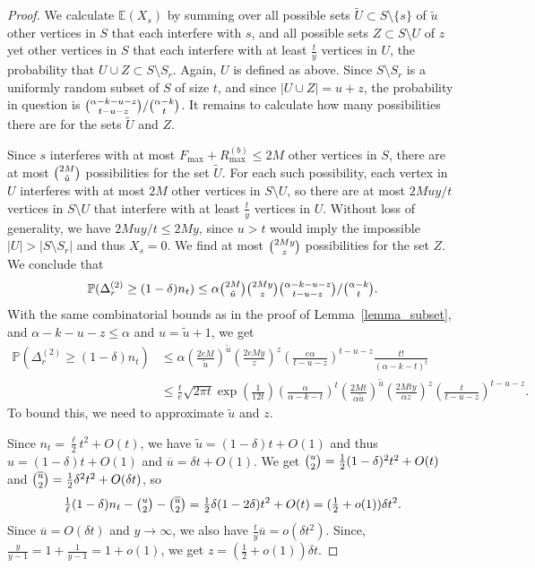 \documentclass{article}
\theoremstyle{plain}
\theoremstyle{remark}
\theoremstyle{plain}
\numberwithin{equation}{section}
\begin{document}
\begin{proof}
		We calculate $\mathbb{E}(X_s)$ by summing over all possible sets $\widetilde{U}\subset S\setminus\{s\}$ of $\widetilde{u}$ other vertices in $S$ that each interfere with $s$, and all possible sets $Z\subset S\setminus U$ of $z$ yet other vertices in $S$ that each interfere with at least $\tfrac{t}{y}$ vertices in $U$, the probability that $U\cup Z\subset S\setminus S_r$. Again, $U$ is defined as above. Since $S\setminus S_r$ is a uniformly random subset of $S$ of size $t$, and since $|U\cup Z|=u+z$, the probability in question is $\tbinom{\alpha-k-u-z}{t-u-z}/\tbinom{\alpha-k}{t}$. It remains to calculate how many possibilities there are for the sets $\widetilde{U}$ and $Z$.
		
		Since $s$ interferes with at most $F_{\max}+R_{\max}^{(b)}\leq2M$ other vertices in $S$, there are at most $\tbinom{2M}{\tilde{u}}$ possibilities for the set $\widetilde{U}$. For each such possibility, each vertex in $U$ interferes with at most $2M$ other vertices in $S\setminus U$, so there are at most $2Muy/t$ vertices in $S\setminus U$ that interfere with at least $\tfrac{t}{y}$ vertices in $U$. Without loss of generality, we have $2Muy/t\leq 2My$, since $u>t$ would imply the impossible $|U|>|S\setminus S_r|$ and thus $X_s=0$. We find at most $\tbinom{2My}{z}$ possibilities for the set $Z$. We conclude that $$\mathbb{P}(\Delta_r^{(2)}\geq(1-\delta)n_t)\leq\alpha\tbinom{2M}{\tilde{u}}\tbinom{2My}{z}\tbinom{\alpha-k-u-z}{t-u-z}/\tbinom{\alpha-k}{t}.$$ With the same combinatorial bounds as in the proof of Lemma~\ref{lemma_subset}, and $\alpha-k-u-z\leq\alpha$ and $u=\widetilde{u}+1$, we get
		\begin{align}
			\mathbb{P}(\Delta_r^{(2)}\geq(1-\delta)n_t)&\leq\alpha(\tfrac{2eM}{\tilde{u}})^{\tilde{u}}(\tfrac{2eMy}{z})^z(\tfrac{e\alpha}{t-u-z})^{t-u-z}\tfrac{t!}{(\alpha-k-t)^t}
			\\&\leq\tfrac{t}{e}\sqrt{2\pi t}\exp(\tfrac1{12t})(\tfrac{\alpha}{\alpha-k-t})^t(\tfrac{2Mt}{\alpha\tilde{u}})^{\tilde{u}}(\tfrac{2Mty}{\alpha z})^z(\tfrac{t}{t-u-z})^{t-u-z}.
		\end{align}
		To bound this, we need to approximate $\widetilde{u}$ and $z$.
		
		Since $n_t=\tfrac{\ell}{2}t^2+O(t)$, we have $\widetilde{u}=(1-\delta)t+O(1)$ and thus $u=(1-\delta)t+O(1)$ and $\overline{u}=\delta t+O(1)$. We get $\tbinom{u}{2}=\tfrac12(1-\delta)^2t^2+O(t)$ and $\tbinom{\overline{u}}{2}=\tfrac12\delta^2t^2+O(\delta t)$, so $$\tfrac1{\ell}(1-\delta)n_t-\tbinom{u}{2}-\tbinom{\overline{u}}{2}=\tfrac12\delta(1-2\delta)t^2+O(t)=(\tfrac12+o(1))\delta t^2.$$ Since $\overline{u}=O(\delta t)$ and $y\to\infty$, we also have $\tfrac{t}{y}\overline{u}=o(\delta t^2)$. Since, $\tfrac{y}{y-1}=1+\tfrac1{y-1}=1+o(1)$, we get $z=(\tfrac12+o(1))\delta t$.
		

\end{proof}
\end{document}

